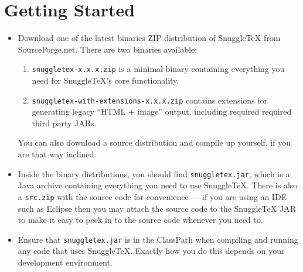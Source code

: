 
\section*{Getting Started}

\begin{itemize}

  \item Download one of the latest binaries ZIP distribution of SnuggleTeX from
        SourceForge.net. There are two binaries available:

        \begin{enumerate}
          \item \verb|snuggletex-x.x.x.zip| is a minimal binary containing
                everything you need for SnuggleTeX's core functionality.

          \item \verb|snuggletex-with-extensions-x.x.x.zip| contains extensions
                for generating legacy ``HTML + image'' output, including required
                required third party JARs.
        \end{enumerate}

        You can also download a source distribution and compile up yourself, if you
        are that way inclined.

  \item Inside the binary distributions, you should find \verb|snuggletex.jar|,
        which is a Java archive containing everything you need to use SnuggleTeX.
        There is also a \verb|src.zip| with the source code for convenience ---
        if you are using an IDE such as Eclipse then you may attach the source
        code to the SnuggleTeX JAR to make it easy to peek in to the source
        code whenever you need to.

  \item Ensure that \verb|snuggletex.jar| is in the ClassPath when compiling
        and running any code that uses SnuggleTeX. Exactly how you do this depends
        on your development environment.

\end{itemize}
